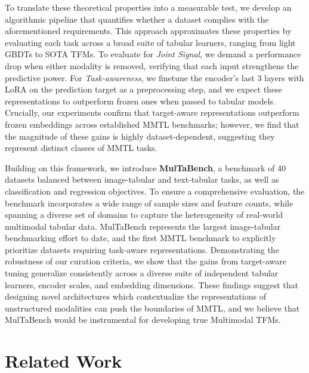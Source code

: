 \documentclass{article}
\begin{document}
To translate these theoretical properties into a measurable test, we develop an algorithmic pipeline that quantifies whether a dataset complies with the aforementioned requirements. This approach approximates these properties by evaluating each task across a broad suite of tabular learners, ranging from light GBDTs to SOTA TFMs. 
To evaluate for \textit{Joint Signal}, we demand a performance drop when either modality is removed, verifying that each input strengthens the predictive power. For \textit{Task-awareness}, we finetune the encoder's last 3 layers with LoRA \cite{hu_lora_2021} on the prediction target as a preprocessing step, and we expect these representations to outperform frozen ones when passed to tabular models. Crucially, our experiments confirm that target-aware representations outperform frozen embeddings across established MMTL benchmarks; however, we find that the magnitude of these gains is highly dataset-dependent, suggesting they represent distinct classes of MMTL tasks.

Building on this framework, we introduce \textbf{MulTaBench}, a benchmark of 40 datasets balanced between image-tabular and text-tabular tasks, as well as classification and regression objectives. To ensure a comprehensive evaluation, the benchmark incorporates a wide range of sample sizes and feature counts, while spanning a diverse set of domains to capture the heterogeneity of real-world multimodal tabular data. MulTaBench represents the largest image-tabular benchmarking effort to date, and the first MMTL benchmark to explicitly prioritize datasets requiring task-aware representations. Demonstrating the robustness of our curation criteria, we show that the gains from target-aware tuning generalize consistently across a diverse suite of independent tabular learners, encoder scales, and embedding dimensions. These findings suggest that designing novel architectures which contextualize the representations of unstructured modalities can push the boundaries of MMTL, and we believe that MulTaBench would be instrumental for developing true Multimodal TFMs. 

\section{Related Work}
\label{sec:related}
\end{document}
